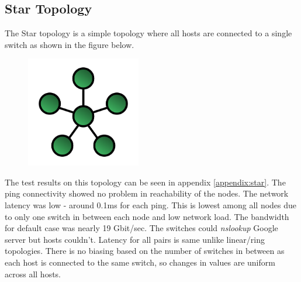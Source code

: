 \documentclass[a4paper, 11pt]{article}
\begin{document}
\newpage

\subsection{Star Topology}

The Star topology is a simple topology where all hosts are connected to a single switch as shown in the figure below.

\begin{figure}[h]
\centering %
\includegraphics[width=5cm]{star}
\end{figure}

The test results on this topology can be seen in appendix \ref{appendix:star}. The ping connectivity showed no problem in reachability of the nodes. The network latency was low - around 0.1ms for each ping. This is lowest among all nodes due to only one switch in between each node and low network load. The bandwidth for default case was nearly 19 Gbit/sec. The switches could \textit{nslookup} Google server but hosts couldn't. Latency for all pairs is same unlike linear/ring topologies. There is no biasing based on the number of switches in between as each host is connected to the same switch, so changes in values are uniform across all hosts.
\end{document}

